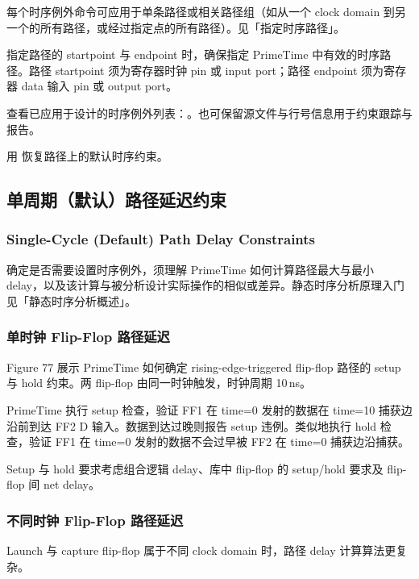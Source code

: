 每个时序例外命令可应用于单条路径或相关路径组（如从一个 clock domain 到另一个的所有路径，或经过指定点的所有路径）。见「指定时序路径」。

指定路径的 startpoint 与 endpoint 时，确保指定 PrimeTime 中有效的时序路径。路径 startpoint 须为寄存器时钟 pin 或 input port；路径 endpoint 须为寄存器 data 输入 pin 或 output port。

查看已应用于设计的时序例外列表：。也可保留源文件与行号信息用于约束跟踪与报告。

用  恢复路径上的默认时序约束。

\subsection{单周期（默认）路径延迟约束}
\subsubsection*{Single-Cycle (Default) Path Delay Constraints}

确定是否需要设置时序例外，须理解 PrimeTime 如何计算路径最大与最小 delay，以及该计算与被分析设计实际操作的相似或差异。静态时序分析原理入门见「静态时序分析概述」。

\subsubsection{单时钟 Flip-Flop 路径延迟}
Figure 77 展示 PrimeTime 如何确定 rising-edge-triggered flip-flop 路径的 setup 与 hold 约束。两 flip-flop 由同一时钟触发，时钟周期 10\,ns。


PrimeTime 执行 setup 检查，验证 FF1 在 time=0 发射的数据在 time=10 捕获边沿前到达 FF2 D 输入。数据到达过晚则报告 setup 违例。类似地执行 hold 检查，验证 FF1 在 time=0 发射的数据不会过早被 FF2 在 time=0 捕获边沿捕获。

Setup 与 hold 要求考虑组合逻辑 delay、库中 flip-flop 的 setup/hold 要求及 flip-flop 间 net delay。

\subsubsection{不同时钟 Flip-Flop 路径延迟}
Launch 与 capture flip-flop 属于不同 clock domain 时，路径 delay 计算算法更复杂。


